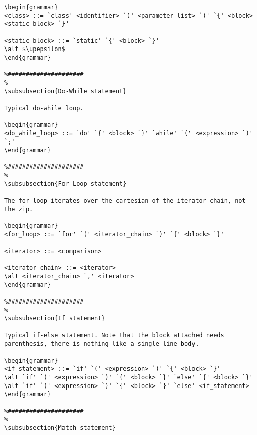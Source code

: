 \begin{verbatim}
\begin{grammar}
<class> ::= `class' <identifier> `(' <parameter_list> `)' `{' <block> <static_block> `}'

<static_block> ::= `static' `{' <block> `}'
\alt $\upepsilon$
\end{grammar}

%#####################
%
\subsubsection{Do-While statement}

Typical do-while loop.

\begin{grammar}
<do_while_loop> ::= `do' `{' <block> `}' `while' `(' <expression> `)' `;'
\end{grammar}

%#####################
%
\subsubsection{For-Loop statement}

The for-loop iterates over the cartesian of the iterator chain, not the zip.

\begin{grammar}
<for_loop> ::= `for' `(' <iterator_chain> `)' `{' <block> `}'

<iterator> ::= <comparison>

<iterator_chain> ::= <iterator>
\alt <iterator_chain> `,' <iterator>
\end{grammar}

%#####################
%
\subsubsection{If statement}

Typical if-else statement. Note that the block attached needs parenthesis, there is nothing like a single line body.

\begin{grammar}
<if_statement> ::= `if' `(' <expression> `)' `{' <block> `}'
\alt `if' `(' <expression> `)' `{' <block> `}' `else' `{' <block> `}'
\alt `if' `(' <expression> `)' `{' <block> `}' `else' <if_statement>
\end{grammar}

%#####################
%
\subsubsection{Match statement}


\end{verbatim}
